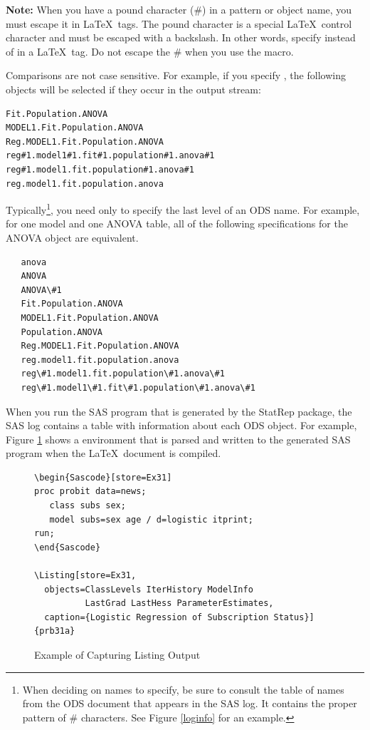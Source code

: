 \documentclass[article,oneside]{memoir}
\newcommand*{\StatRep}{\textsf{StatRep}\xspace}
\begin{document}
  \textbf{Note:} When you have a pound character (\#) in a pattern or object name,
  you must escape it in \LaTeX\ tags. The pound character is a special \LaTeX\ control
  character and must be escaped with a backslash.
  In other words, specify  instead of
   in a \LaTeX\ tag.
  Do not escape the \# when you use the  macro.

  Comparisons are not case sensitive. For example, if you specify ,
  the following objects will be selected if they occur in the output stream:
\begin{snugshade}
\begin{verbatim}
Fit.Population.ANOVA
MODEL1.Fit.Population.ANOVA
Reg.MODEL1.Fit.Population.ANOVA
reg#1.model1#1.fit#1.population#1.anova#1
reg#1.model1.fit.population#1.anova#1
reg.model1.fit.population.anova
\end{verbatim}
\end{snugshade}

  Typically\footnote{When deciding on names to specify, be sure to consult the table of names
  from the ODS document that appears in the SAS log. It contains the proper pattern
  of \# characters. See Figure \ref{loginfo} for an example.},
  you need only to specify the last level of an ODS name.
  For example, for one model and one ANOVA table,
  all of the following specifications for the ANOVA object are equivalent.

\begin{snugshade}
\begin{verbatim}
   anova
   ANOVA
   ANOVA\#1
   Fit.Population.ANOVA
   MODEL1.Fit.Population.ANOVA
   Population.ANOVA
   Reg.MODEL1.Fit.Population.ANOVA
   reg.model1.fit.population.anova
   reg\#1.model1.fit.population\#1.anova\#1
   reg\#1.model1\#1.fit\#1.population\#1.anova\#1
\end{verbatim}
\end{snugshade}

  When you run the SAS program that is generated by the \StatRep package,
  the SAS log contains a table with information about each ODS object.
  For example, Figure \ref{capturelist} shows a  environment that
  is parsed and written to the generated SAS program when the \LaTeX\ document
  is compiled.
\begin{figure}[H]
\begin{snugshade}
\begin{verbatim}
\begin{Sascode}[store=Ex31]
proc probit data=news;
   class subs sex;
   model subs=sex age / d=logistic itprint;
run;
\end{Sascode}

\Listing[store=Ex31,
  objects=ClassLevels IterHistory ModelInfo
          LastGrad LastHess ParameterEstimates,
  caption={Logistic Regression of Subscription Status}]{prb31a}

\end{verbatim}
\end{snugshade}
\caption{Example of Capturing Listing Output}\label{capturelist}
\end{figure}
\end{document}
